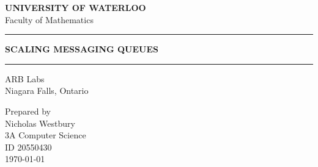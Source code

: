 \documentclass[12pt]{report}
\newcommand{\HRule}[1]{\rule{\linewidth}{#1}}
\begin{document}
\begin{titlepage}
   \begin{center}
    	\normalsize \textbf{\uppercase{University of Waterloo}} \\
		Faculty of Mathematics \\
	\end{center}	
	\begin{center}
		\HRule{0.5pt}
   		\LARGE \textbf{\uppercase{Scaling Messaging Queues}}
   		\HRule{0.5pt}
	\end{center}
	\begin{center}
	   		\normalsize {ARB Labs\\ Niagara Falls, Ontario}	
	 
	\end{center}
	\begin{center}
	   		\normalsize {Prepared by\\
				Nicholas Westbury\\
				3A Computer Science\\
				ID 20550430\\
	   		 	\today
	   		 }
	\end{center}
\end{titlepage}
\end{document}
